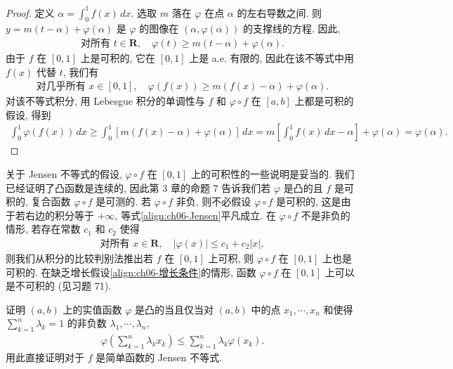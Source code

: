 \documentclass[../../main.tex]{subfiles}
\begin{document}
\begin{proof}
定义 $\alpha=\int_{0}^{1}f(x)\,dx$. 选取 $m$ 落在 $\varphi$ 在点 $\alpha$ 的左右导数之间. 则 $y=m(t-\alpha)+\varphi(\alpha)$ 是 $\varphi$ 的图像在 $(\alpha,\varphi(\alpha))$ 的支撑线的方程. 因此,
\begin{align*}
\text{对所有 }t\in\mathbf{R},\quad\varphi(t)\geqslant m(t-\alpha)+\varphi(\alpha).
\end{align*}
由于 $f$ 在 $[0,1]$ 上是可积的, 它在 $[0,1]$ 上是 a.e. 有限的, 因此在该不等式中用 $f(x)$ 代替 $t$, 我们有
\begin{align*}
\text{对几乎所有 }x\in[0,1],\quad\varphi(f(x))\geqslant m(f(x)-\alpha)+\varphi(\alpha).
\end{align*}
对该不等式积分, 用 Lebesgue 积分的单调性与 $f$ 和 $\varphi\circ f$ 在 $[a,b]$ 上都是可积的假设, 得到
\begin{align*}
\int_{0}^{1}\varphi(f(x))\,dx\geqslant\int_{0}^{1}[m(f(x)-\alpha)+\varphi(\alpha)]\,dx=m\left[\int_{0}^{1}f(x)\,dx-\alpha\right]+\varphi(\alpha)=\varphi(\alpha).
\end{align*}
\end{proof}

关于 Jensen 不等式的假设, $\varphi\circ f$ 在 $[0,1]$ 上的可积性的一些说明是妥当的. 我们已经证明了凸函数是连续的, 因此第 3 章的命题 7 告诉我们若 $\varphi$ 是凸的且 $f$ 是可积的, 复合函数 $\varphi\circ f$ 是可测的. 若 $\varphi\circ f$ 非负, 则不必假设 $\varphi\circ f$ 是可积的, 这是由于若右边的积分等于 $+\infty$, 等式\eqref{align:ch06-Jensen}平凡成立. 在 $\varphi\circ f$ 不是非负的情形, 若存在常数 $c_{1}$ 和 $c_{2}$ 使得
\begin{align}
\text{对所有 }x\in\mathbf{R},\quad|\varphi(x)|\leqslant c_{1}+c_{2}|x|,\label{align:ch06-增长条件}
\end{align}
则我们从积分的比较判别法推出若 $f$ 在 $[0,1]$ 上可积, 则 $\varphi\circ f$ 在 $[0,1]$ 上也是可积的. 在缺乏增长假设\eqref{align:ch06-增长条件}的情形, 函数 $\varphi\circ f$ 在 $[0,1]$ 上可以是不可积的 (见习题 71).

\begin{exercise}\label{exercise:ch06-61}
证明 $(a,b)$ 上的实值函数 $\varphi$ 是凸的当且仅当对 $(a,b)$ 中的点 $x_{1},\cdots,x_{n}$ 和使得 $\sum_{k=1}^{n}\lambda_{k}=1$ 的非负数 $\lambda_{1},\cdots,\lambda_{n}$,
\begin{align*}
\varphi\left(\sum_{k=1}^{n}\lambda_{k}x_{k}\right)\leqslant\sum_{k=1}^{n}\lambda_{k}\varphi(x_{k}).
\end{align*}
用此直接证明对于 $f$ 是简单函数的 Jensen 不等式.
\end{exercise}
\end{document}
